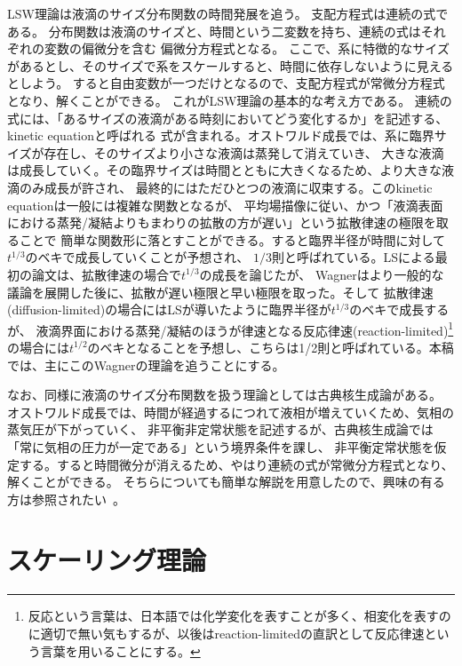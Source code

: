 \documentclass{jarticle}
\begin{document}
LSW理論は液滴のサイズ分布関数の時間発展を追う。
支配方程式は連続の式である。
分布関数は液滴のサイズと、時間という二変数を持ち、連続の式はそれぞれの変数の偏微分を含む
偏微分方程式となる。
ここで、系に特徴的なサイズがあるとし、そのサイズで系をスケールすると、時間に依存しないように見えるとしよう。
すると自由変数が一つだけとなるので、支配方程式が常微分方程式となり、解くことができる。
これがLSW理論の基本的な考え方である。
連続の式には、「あるサイズの液滴がある時刻においてどう変化するか」を記述する、kinetic equationと呼ばれる
式が含まれる。オストワルド成長では、系に臨界サイズが存在し、そのサイズより小さな液滴は蒸発して消えていき、
大きな液滴は成長していく。その臨界サイズは時間とともに大きくなるため、より大きな液滴のみ成長が許され、
最終的にはただひとつの液滴に収束する。このkinetic equationは一般には複雑な関数となるが、
平均場描像に従い、かつ「液滴表面における蒸発/凝結よりもまわりの拡散の方が遅い」という拡散律速の極限を取ることで
簡単な関数形に落とすことができる。すると臨界半径が時間に対して$t^{1/3}$のベキで成長していくことが予想され、
$1/3$則と呼ばれている。LSによる最初の論文は、拡散律速の場合で$t^{1/3}$の成長を論じたが、
Wagnerはより一般的な議論を展開した後に、拡散が遅い極限と早い極限を取った。そして
拡散律速(diffusion-limited)の場合にはLSが導いたように臨界半径が$t^{1/3}$のベキで成長するが、
液滴界面における蒸発/凝結のほうが律速となる反応律速(reaction-limited)\footnote{反応という言葉は、日本語では化学変化を表すことが多く、相変化を表すのに適切で無い気もするが、以後はreaction-limitedの直訳として反応律速という言葉を用いることにする。}の場合には$t^{1/2}$のベキとなることを予想し、こちらは1/2則と呼ばれている。本稿では、主にこのWagnerの理論を追うことにする。

なお、同様に液滴のサイズ分布関数を扱う理論としては古典核生成論がある。
オストワルド成長では、時間が経過するにつれて液相が増えていくため、気相の蒸気圧が下がっていく、
非平衡非定常状態を記述するが、古典核生成論では「常に気相の圧力が一定である」という境界条件を課し、
非平衡定常状態を仮定する。すると時間微分が消えるため、やはり連続の式が常微分方程式となり、解くことができる。
そちらについても簡単な解説を用意したので、興味の有る方は参照されたい~\cite{cntnote}。

\section{スケーリング理論}
\end{document}
